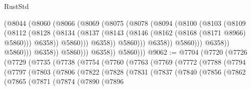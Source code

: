 \begin{lexlean}{RustStd}
\begin{coremodule}
                                  (@8044
                                    (@8060
                                      (@8066
                                        (@8069
                                          (@8075
                                            (@8078
                                              (@8094
                                                (@8100
                                                  (@8103
                                                    (@8109
                                                      (@8112
                                                        (@8128
                                                          (@8134
                                                            (@8137
                                                              (@8143
                                                                (@8146
                                                                  (@8162
                                                                    (@8168 (@8171 @8966) @5860)))
                                                                @6358))
                                                            @5860)))
                                                      @6358))
                                                  @5860)))
                                            @6358))
                                        @5860)))
                                  @6358))
                              @5860)))
                        @6358))
                    @5860)))
              @6358))
          @5860)))
@9062 := @7704
    (@7720
      (@7726
        (@7729
          (@7735
            (@7738
              (@7754
                (@7760
                  (@7763
                    (@7769
                      (@7772
                        (@7788
                          (@7794
                            (@7797
                              (@7803
                                (@7806
                                  (@7822
                                    (@7828
                                      (@7831
                                        (@7837
                                          (@7840
                                            (@7856
                                              (@7862
                                                (@7865
                                                  (@7871
                                                    (@7874
                                                      (@7890
                                                        (@7896

\end{coremodule}
\end{lexlean}
